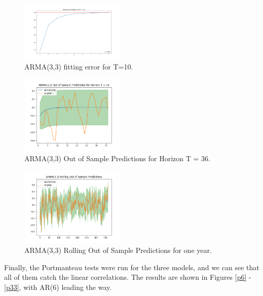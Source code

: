\documentclass[conference]{IEEEtran}
\begin{document}
\begin{figure}[ht]
    \centering
    \includegraphics[width=0.45\textwidth]{Figures/Fitting Error of ARIMA(3,0,3) for T = 10.png}
    \caption{ARMA(3,3) fitting error for T=10.}
    \label{fe33}
\end{figure}

\begin{figure}[ht]
    \centering
    \includegraphics[width=0.45\textwidth]{Figures/ARMA(3,3) Out of Sample Predictions for Horizon T = 36.png}
    \caption{ARMA(3,3) Out of Sample Predictions for Horizon T = 36.}
    \label{hor33}
\end{figure}
\vspace{40mm}

\begin{figure}[ht]
    \centering
    \includegraphics[width=0.45\textwidth]{Figures/ARMA(3,3) Rolling Out of Sample Predictions.png}
    \caption{ARMA(3,3) Rolling Out of Sample Predictions for one year.}
    \label{rol33}
\end{figure}

Finally, the Portmanteau tests were run for the three models, and we can see that all of them catch the linear correlations. The results are shown in Figures \ref{p6} - \ref{p33}, with AR(6) leading the way.
\end{document}
